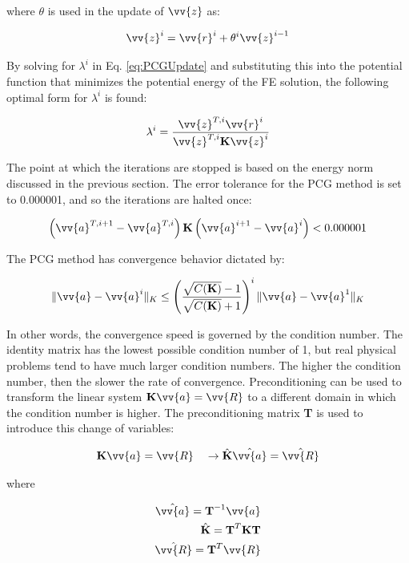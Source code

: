 \documentclass[10pt]{article}
\begin{document}
where \(\theta\) is used in the update of \(\vv{z}\) as:

\begin{equation}
\vv{z}^i=\vv{r}^i+\theta^i\vv{z}^{i-1}
\end{equation}

By solving for \(\lambda^i\) in Eq. \eqref{eq:PCGUpdate} and substituting this into the potential function that minimizes the potential energy of the FE solution, the following optimal form for \(\lambda^i\) is found:

\begin{equation}
\lambda^i=\frac{\vv{z}^{T,i}\vv{r}^i}{\vv{z}^{T,i}\textbf{K}\vv{z}^i}
\end{equation}

The point at which the iterations are stopped is based on the energy norm discussed in the previous section. The error tolerance for the PCG method is set to 0.000001, and so the iterations are halted once:

\begin{equation}
\left(\vv{a}^{T,i+1}-\vv{a}^{T,i}\right)\textbf{K}\left(\vv{a}^{i+1}-\vv{a}^i\right)<0.000001
\end{equation}

The PCG method has convergence behavior dictated by:

\begin{equation}
\label{eq:PCGConvergence}
\|\vv{a}-\vv{a}^{i}\|_K\leq\left(\frac{\sqrt{C(\textbf{K})}-1}{\sqrt{C(\textbf{K})}+1}\right)^i\|\vv{a}-\vv{a}^1\|_K
\end{equation}

In other words, the convergence speed is governed by the condition number. The identity matrix has the lowest possible condition number of 1, but real physical problems tend to have much larger condition numbers. The higher the condition number, then the slower the rate of convergence. Preconditioning can be used to transform the linear system \(\textbf{K}\vv{a}=\vv{R}\) to a different domain in which the condition number is higher. The preconditioning matrix \textbf{T} is used to introduce this change of variables:

\begin{equation}
\label{eq:Transformation}
\textbf{K}\vv{a}=\vv{R}\quad\rightarrow\hat{\textbf{K}}\hat{\vv{a}}=\hat{\vv{R}}
\end{equation}

where

\begin{equation}
\label{eq:TransformationSpecs}
\begin{aligned}
\hat{\vv{a}}=\textbf{T}^{-1}\vv{a}\\
\hat{\textbf{K}}=\textbf{T}^{T}\textbf{K}\textbf{T}\\
\hat{\vv{R}}=\textbf{T}^T\vv{R}\\
\end{aligned}
\end{equation}
\end{document}
